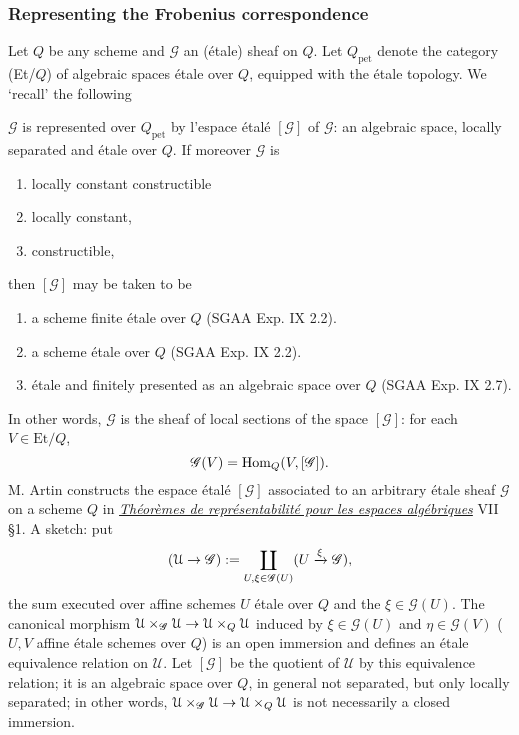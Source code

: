 \documentclass[deligne.tex]{subfiles}
\begin{document}
\subsubsection{Representing the Frobenius correspondence}
Let $Q$ be any scheme and $\mathscr G$ an (étale) sheaf on $Q$.
Let $Q_{\mathrm{pet}}$ denote the category (Et/$Q$) of algebraic spaces
étale over $Q$, equipped with the étale topology.
We `recall' the following
\begin{proposition*} $\mathscr G$ is represented over $Q_{\mathrm{pet}}$ by
l'espace étalé $[\mathscr G]$ of $\mathscr G$: an algebraic space, locally 
separated and étale over $Q$.
If moreover $\mathscr G$ is
\begin{enumerate}[label=(\greek*)]
	\item locally constant constructible
	\item locally constant,
	\item constructible,
\end{enumerate}
then $[\mathscr G]$ may be taken to be
\begin{enumerate}[label=(\greek*)]
	\item a scheme finite étale over $Q$ (SGAA Exp. IX 2.2).
	\item a scheme étale over $Q$ (SGAA Exp. IX 2.2).
	\item étale and finitely presented as an algebraic space over $Q$ (SGAA Exp. IX 2.7).
\end{enumerate}
\end{proposition*}
In other words, $\mathscr G$ is the sheaf of local sections of the space
$[\mathscr G]$: for each $V\in\mathrm{Et/}Q$,
\begin{equation*}
	\mathscr G(V)=\operatorname{Hom}_Q(V,[\mathscr G]).
\end{equation*}
M. Artin constructs the espace étalé $[\mathscr G]$ associated to an 
arbitrary étale sheaf $\mathscr G$ on a scheme $Q$ in
\href{http://math.uchicago.edu/~barrett/resources/Artin_theoremes_de_representabilite_pour_les_espaces_algebriques.pdf}{\emph{Théorèmes de représentabilité pour les espaces algébriques}} VII \S1.
A sketch: put
\begin{equation*}
	(\mathcal U\rightarrow\mathscr G):=\coprod_{U,\xi\in\mathscr G(U)}(U\xrightarrow\xi\mathscr G),
\end{equation*}
the sum executed over affine schemes $U$ étale over $Q$ and the
$\xi\in\mathscr G(U)$. The canonical morphism
$\mathcal U\times_\mathscr G\mathcal U\rightarrow\mathcal U\times_Q\mathcal U$
induced by $\xi\in\mathscr G(U)$ and $\eta\in\mathscr G(V)$
($U,V$ affine étale schemes over $Q$) is an open immersion and defines an 
étale equivalence relation on $\mathcal U$. Let $[\mathscr G]$ be the 
quotient of $\mathcal U$ by this equivalence relation; it is an algebraic
space over $Q$, in general not separated, but only locally separated;
in other words,
$\mathcal U\times_{\mathscr G}\mathcal U\rightarrow\mathcal U\times_Q\mathcal U$ 
is not necessarily a closed immersion.
\end{document}
